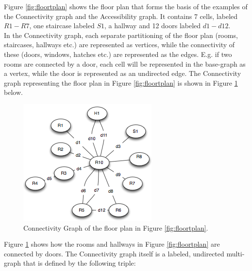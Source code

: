 Figure \ref{fig:floortplan} shows the floor plan that forms the basis of the examples of the Connectivity graph and the Accessibility graph. 
It contains 7 cells, labeled $R1 - R7$, one staircase labeled $S1$, a hallway and 12 doors labeled $d1-d12$. \\

In the Connectivity graph, each separate partitioning of the floor plan (rooms, staircases, hallways etc.) are represented as vertices, while the connectivity of these (doors, windows, hatches etc.) are represented as the edges.
E.g. if two rooms are connected by a door, each cell will be represented in the base-graph as a vertex, while the door is represented as an undirected edge. 
The Connectivity graph representing the floor plan in Figure \ref{fig:floortplan} is shown in Figure \ref{fig:connectivitygraph} below. 

\begin{figure}[H]%
\includegraphics[width=\columnwidth]{images/connectivitygraph.png}%
\caption{Connectivity Graph of the floor plan in Figure \ref{fig:floortplan}.}%
\label{fig:connectivitygraph}%
\end{figure}%

Figure \ref{fig:connectivitygraph} shows how the rooms and hallways in Figure \ref{fig:floortplan} are connected by doors. 
The Connectivity graph itself is a labeled, undirected multi-graph that is defined by the following triple: \\

